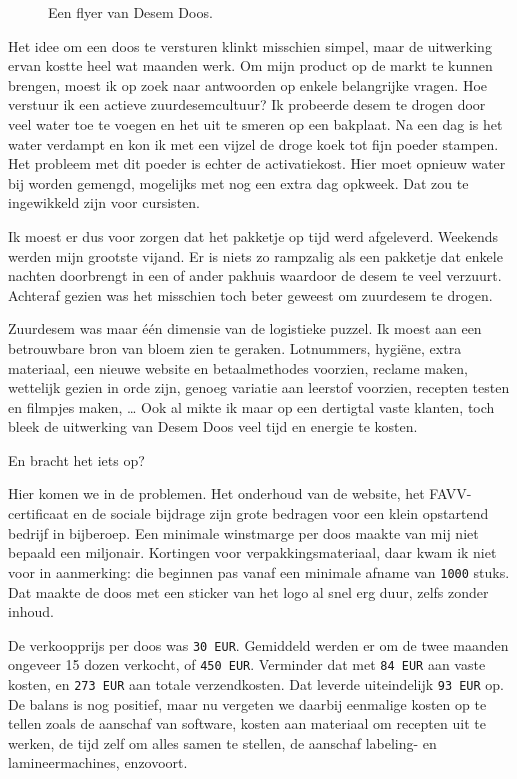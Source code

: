\documentclass[
  11pt,
  dutch,
]{memoir}
\newcommand{\adjustimg}{%
  \checkoddpage%
  \ifoddpage\hspace*{\dimexpr\evensidemargin-\oddsidemargin}\else\hspace*{-\dimexpr\evensidemargin-\oddsidemargin}\fi%
}
\newcommand{\centerimg}[2][width=\textwidth]{%
  \makebox[\textwidth]{\adjustimg\texttt{[image: \#2]}}%
}
\begin{document}
\begin{figure}
    \mbox{} \par
    \noindent\centerimg[width=\paperwidth]{img/bw/desemdoos.jpg}
    \caption{Een flyer van Desem Doos.}
\end{figure}

Het idee om een doos te versturen klinkt misschien simpel, maar de
uitwerking ervan kostte heel wat maanden werk. Om mijn product op de
markt te kunnen brengen, moest ik op zoek naar antwoorden op enkele
belangrijke vragen. Hoe verstuur ik een actieve zuurdesemcultuur? Ik
probeerde desem te drogen door veel water toe te voegen en het uit te
smeren op een bakplaat. Na een dag is het water verdampt en kon ik met
een vijzel de droge koek tot fijn poeder stampen. Het probleem met dit
poeder is echter de activatiekost. Hier moet opnieuw water bij worden
gemengd, mogelijks met nog een extra dag opkweek. Dat zou te ingewikkeld
zijn voor cursisten.

Ik moest er dus voor zorgen dat het pakketje op tijd werd afgeleverd.
Weekends werden mijn grootste vijand. Er is niets zo rampzalig als een
pakketje dat enkele nachten doorbrengt in een of ander pakhuis waardoor
de desem te veel verzuurt. Achteraf gezien was het misschien toch beter
geweest om zuurdesem te drogen.

Zuurdesem was maar één dimensie van de logistieke puzzel. Ik moest aan
een betrouwbare bron van bloem zien te geraken. Lotnummers, hygiëne,
extra materiaal, een nieuwe website en betaalmethodes voorzien, reclame
maken, wettelijk gezien in orde zijn, genoeg variatie aan leerstof
voorzien, recepten testen en filmpjes maken, \ldots{} Ook al mikte ik
maar op een dertigtal vaste klanten, toch bleek de uitwerking van Desem
Doos veel tijd en energie te kosten.

En bracht het iets op?

Hier komen we in de problemen. Het onderhoud van de website, het
FAVV-certificaat en de sociale bijdrage zijn grote bedragen voor een
klein opstartend bedrijf in bijberoep. Een minimale winstmarge per doos
maakte van mij niet bepaald een miljonair. Kortingen voor
verpakkingsmateriaal, daar kwam ik niet voor in aanmerking: die beginnen
pas vanaf een minimale afname van \texttt{1000} stuks. Dat maakte de
doos met een sticker van het logo al snel erg duur, zelfs zonder inhoud.

De verkoopprijs per doos was \texttt{30\ EUR}. Gemiddeld werden er om de
twee maanden ongeveer 15 dozen verkocht, of \texttt{450\ EUR}. Verminder
dat met \texttt{84\ EUR} aan vaste kosten, en \texttt{273\ EUR} aan
totale verzendkosten. Dat leverde uiteindelijk \texttt{93\ EUR} op. De
balans is nog positief, maar nu vergeten we daarbij eenmalige kosten op
te tellen zoals de aanschaf van software, kosten aan materiaal om
recepten uit te werken, de tijd zelf om alles samen te stellen, de
aanschaf labeling- en lamineermachines, enzovoort.
\end{document}
